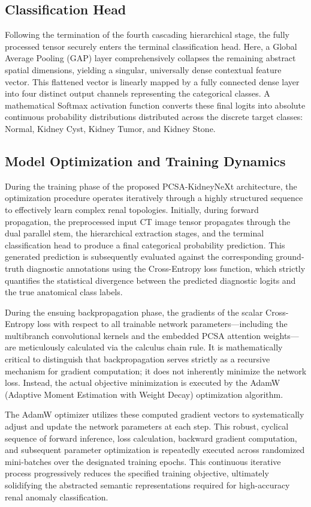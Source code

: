 \documentclass[]{elsarticle}
\begin{document}
\subsection{Classification Head}
Following the termination of the fourth cascading hierarchical stage, the fully processed tensor securely enters the terminal classification head. Here, a Global Average Pooling (GAP) layer comprehensively collapses the remaining abstract spatial dimensions, yielding a singular, universally dense contextual feature vector. This flattened vector is linearly mapped by a fully connected dense layer into four distinct output channels representing the categorical classes. A mathematical Softmax activation function converts these final logits into absolute continuous probability distributions distributed across the discrete target classes: Normal, Kidney Cyst, Kidney Tumor, and Kidney Stone.

\subsection{Model Optimization and Training Dynamics}
During the training phase of the proposed PCSA-KidneyNeXt architecture, the optimization procedure operates iteratively through a highly structured sequence to effectively learn complex renal topologies. Initially, during forward propagation, the preprocessed input CT image tensor propagates through the dual parallel stem, the hierarchical extraction stages, and the terminal classification head to produce a final categorical probability prediction. This generated prediction is subsequently evaluated against the corresponding ground-truth diagnostic annotations using the Cross-Entropy loss function, which strictly quantifies the statistical divergence between the predicted diagnostic logits and the true anatomical class labels. 

During the ensuing backpropagation phase, the gradients of the scalar Cross-Entropy loss with respect to all trainable network parameters---including the multibranch convolutional kernels and the embedded PCSA attention weights---are meticulously calculated via the calculus chain rule. It is mathematically critical to distinguish that backpropagation serves strictly as a recursive mechanism for gradient computation; it does not inherently minimize the network loss. Instead, the actual objective minimization is executed by the AdamW (Adaptive Moment Estimation with Weight Decay) optimization algorithm. 

The AdamW optimizer utilizes these computed gradient vectors to systematically adjust and update the network parameters at each step. This robust, cyclical sequence of forward inference, loss calculation, backward gradient computation, and subsequent parameter optimization is repeatedly executed across randomized mini-batches over the designated training epochs. This continuous iterative process progressively reduces the specified training objective, ultimately solidifying the abstracted semantic representations required for high-accuracy renal anomaly classification.
\end{document}

